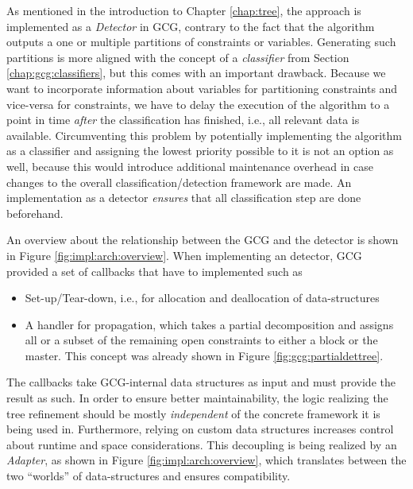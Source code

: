 		As mentioned in the introduction to Chapter \ref{chap:tree}, the approach is implemented as a \textit{Detector} in \ac{GCG}, contrary to the fact that the algorithm outputs a one or multiple partitions of constraints or variables.
		Generating such partitions is more aligned with the concept of a \textit{classifier} from Section \ref{chap:gcg:classifiers}, but this comes with an important drawback.
		Because we want to incorporate information about variables for partitioning constraints and vice-versa for constraints, we have to delay the execution of the algorithm to a point in time \textit{after} the classification has finished, i.e., all relevant data is available.
		Circumventing this problem by potentially implementing the algorithm as a classifier and assigning the lowest priority possible to it is not an option as well, because this would introduce additional maintenance overhead in case changes to the overall classification/detection framework are made.
		An implementation as a detector \textit{ensures} that all classification step are done beforehand.
		
		An overview about the relationship between the \ac{GCG} and the detector is shown in Figure \ref{fig:impl:arch:overview}.
		When implementing an detector, \ac{GCG} provided a set of callbacks that have to implemented such as
		\begin{itemize}
			\item Set-up/Tear-down, i.e., for allocation and deallocation of data-structures
			\item A handler for propagation, which takes a partial decomposition and assigns all or a subset of the remaining open constraints to either a block or the master. This concept was already shown in Figure \ref{fig:gcg:partialdettree}.
		\end{itemize}
		
		\clearpage
		
		The callbacks take \ac{GCG}-internal data structures as input and must provide the result as such.
		In order to ensure better maintainability, the logic realizing the tree refinement should be mostly \textit{independent} of the concrete framework it is being used in.
		Furthermore, relying on custom data structures increases control about runtime and space considerations. 
		This decoupling is being realized by an \textit{Adapter}, as shown in Figure \ref{fig:impl:arch:overview}, which translates between the two \enquote{worlds} of data-structures and ensures compatibility.
	
